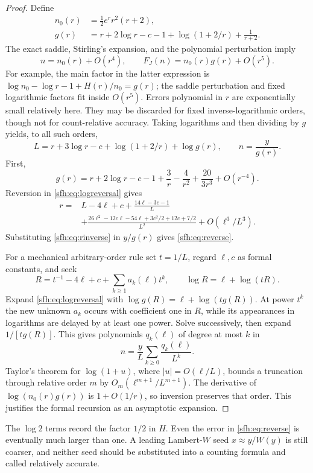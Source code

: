 \begin{proof}
Define
\begin{align}
 n_0(r)&=\tfrac12e^rr^2(r+2),\nonumber\\
 g(r)&=r+2\log r-c-1+\log(1+2/r)+\frac1{r+2}.\label{sfh:eq:g}
\end{align}
The exact saddle, Stirling's expansion, and the polynomial perturbation imply
\[
 n=n_0(r)+O(r^4),\qquad F_J(n)=n_0(r)g(r)+O(r^5).
\]
For example, the main factor in the latter expression is
$\log n_0-\log r-1+H(r)/n_0=g(r)$; the saddle perturbation and fixed logarithmic factors fit inside $O(r^5)$. Errors polynomial in $r$ are exponentially small relatively here. They may be discarded for fixed inverse-logarithmic orders, though not for count-relative accuracy. Taking logarithms and then dividing by $g$ yields, to all such orders,
\begin{equation}\label{sfh:eq:logreversal}
 L=r+3\log r-c+\log(1+2/r)+\log g(r),\qquad n=\frac y{g(r)}.
\end{equation}
First,
\[
 g(r)=r+2\log r-c-1+\frac3r-\frac4{r^2}
                  +\frac{20}{3r^3}+O(r^{-4}).
\]
Reversion in \eqref{sfh:eq:logreversal} gives
\begin{align}\label{sfh:eq:rinverse}
 r={}&L-4\ell+c+\frac{14\ell-3c-1}{L}\\
 &+\frac{26\ell^2-12c\ell-54\ell+3c^2/2+12c+7/2}{L^2}
 +O(\ell^3/L^3).\nonumber
\end{align}
Substituting \eqref{sfh:eq:rinverse} in $y/g(r)$ gives \eqref{sfh:eq:reverse}.

For a mechanical arbitrary-order rule set $t=1/L$, regard $\ell,c$ as formal constants, and seek
\[
 R=t^{-1}-4\ell+c+\sum_{k\ge1}a_k(\ell)t^k,
 \qquad \log R=\ell+\log(tR).
\]
Expand \eqref{sfh:eq:logreversal} with $\log g(R)=\ell+\log(tg(R))$. At power $t^k$ the new unknown $a_k$ occurs with coefficient one in $R$, while its appearances in logarithms are delayed by at least one power. Solve successively, then expand $1/[t g(R)]$. This gives polynomials $q_k(\ell)$ of degree at most $k$ in
\[
 n=\frac yL\sum_{k\ge0}\frac{q_k(\ell)}{L^k}.
\]
Taylor's theorem for $\log(1+u)$, where $|u|=O(\ell/L)$, bounds a truncation through relative order $m$ by $O_m(\ell^{m+1}/L^{m+1})$. The derivative of $\log(n_0(r)g(r))$ is $1+O(1/r)$, so inversion preserves that order. This justifies the formal recursion as an asymptotic expansion.
\end{proof}

The $\log2$ terms record the factor $1/2$ in $H$. Even the error in \eqref{sfh:eq:reverse} is eventually much larger than one. A leading Lambert-$W$ seed $x\approx y/W(y)$ is still coarser, and neither seed should be substituted into a counting formula and called relatively accurate.

